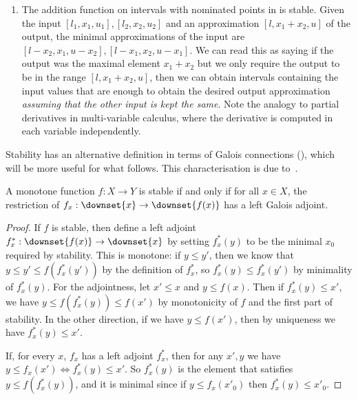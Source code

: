 \begin{example}
\begin{enumerate}[leftmargin=\enummargin]
  \item The addition function on intervals with nominated points in
     is stable. Given the input
    $[l_1,x_1,u_1], [l_2,x_2,u_2]$ and an approximation
    $[l,x_1+x_2,u]$ of the output, the minimal approximations of the
    input are $[l-x_2,x_1,u-x_2], [l-x_1,x_2,u-x_1]$. We can read this
    as saying if the output was the maximal element $x_1+x_2$ but we
    only require the output to be in the range $[l,x_1+x_2,u]$, then
    we can obtain intervals containing the input values that are
    enough to obtain the desired output approximation \emph{assuming
      that the other input is kept the same}. Note the analogy to
    partial derivatives in multi-variable calculus, where the
    derivative is computed in each variable independently.
  \end{enumerate}
\end{example}


Stability has an alternative definition in terms of Galois
connections (), which will be more useful for what follows. This
characterisation is due to~\citet{taylor99}. 

\begin{lemma}
  A monotone function $f : X \to Y$ is stable if and only if for all
  $x \in X$, the restriction of $f_x : \downset{x} \to \downset{f(x)}$
  has a left Galois adjoint.
\end{lemma}

\begin{proof}
  If $f$ is stable, then define a left adjoint
  $f^*_x : \downset{f(x)} \to \downset{x}$ by setting $f^*_x(y)$ to be
  the minimal $x_0$ required by stability. This is monotone: if
  $y \leq y'$, then we know that $y \leq y' \leq f(f^*_x(y'))$ by the
  definition of $f^*_x$, so $f^*_x(y) \leq f^*_x(y')$ by minimality of
  $f^*_x(y)$. For the adjointness, let $x' \leq x$ and $y \leq
  f(x)$. Then if $f^*_x(y) \leq x'$, we have
  $y \leq f(f^*_x(y)) \leq f(x')$ by monotonicity of $f$ and the first
  part of stability. In the other direction, if we have
  $y \leq f(x')$, then by uniqueness we have $f^*_x(y) \leq x'$.

  If, for every $x$, $f_x$ has a left adjoint $f^*_x$, then for any
  $x', y$ we have $y \leq f_x(x') \Leftrightarrow f^*_x(y) \leq
  x'$. So $f^*_x(y)$ is the element that satisfies
  $y \leq f(f^*_x(y))$, and it is minimal since if $y \leq f_x(x'_0)$
  then $f^*_x(y) \leq x'_0$.
\end{proof}

